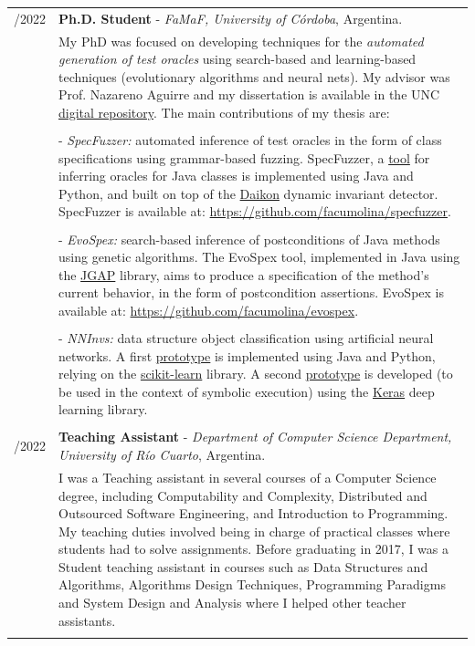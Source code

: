 \documentclass[a4paper,10pt]{article} %
\begin{document}
\begin{longtable}{>{\raggedleft\arraybackslash}p{} p{}}
2017/2022 & \textbf{Ph.D. Student} - \textit{FaMaF, University of Córdoba}, Argentina. \\ 
& My PhD was focused on developing techniques for the \textit{automated generation of test oracles} using search-based and learning-based techniques (evolutionary algorithms and neural nets). My advisor was Prof. Nazareno Aguirre and my dissertation is available in the UNC \href{https://rdu.unc.edu.ar/handle/11086/26692}{digital repository}. The main contributions of my thesis are: \\ & \\
& - \textit{SpecFuzzer:} automated inference of test oracles in the form of class specifications using grammar-based fuzzing. SpecFuzzer, a \href{https://github.com/facumolina/specfuzzer}{tool} for inferring oracles for Java classes is implemented using Java and Python, and built on top of the \href{https://plse.cs.washington.edu/daikon/}{Daikon} dynamic invariant detector. SpecFuzzer is available at: \href{https://github.com/facumolina/specfuzzer}{https://github.com/facumolina/specfuzzer}. \\ & \\
& - \textit{EvoSpex:} search-based inference of postconditions of Java methods using genetic algorithms. The EvoSpex tool, implemented in Java using the \href{https://homepages.ecs.vuw.ac.nz/~lensenandr/jgap/documentation/}{JGAP} library, aims to produce a specification of the method's current behavior, in the form of postcondition assertions. EvoSpex is available at: \href{https://github.com/facumolina/evospex}{https://github.com/facumolina/evospex}. \\ & \\
& - \textit{NNInvs:} data structure object classification using artificial neural networks. A first \href{https://sites.google.com/site/learninginvariants}{prototype} is implemented using Java and Python, relying on the \href{https://scikit-learn.org/stable/index.html}{scikit-learn} library. A second \href{https://sites.google.com/site/learninginvariants}{prototype} is developed (to be used in the context of symbolic execution) using the \href{https://keras.io/}{Keras} deep learning library. \\ & \\ 

2014/2022 & \textbf{Teaching Assistant} - \textit{Department of Computer Science Department, University of Río Cuarto}, Argentina. \\ 
& I was a Teaching assistant in several courses of a Computer Science degree, including Computability and Complexity, Distributed and Outsourced Software Engineering, and Introduction to Programming. My teaching duties involved being in charge of practical classes where students had to solve assignments. Before graduating in 2017, I was a Student teaching assistant in courses such as Data Structures and Algorithms, Algorithms Design Techniques, Programming Paradigms and System Design and Analysis where I helped other teacher assistants. \\ & \\


\end{longtable}
\end{document}
